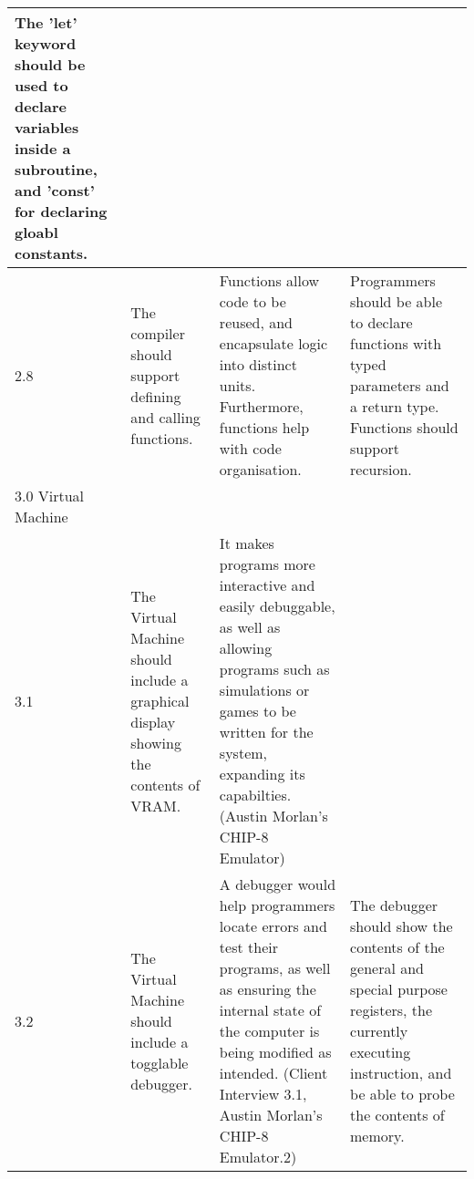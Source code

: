 \begin{longtable}{ | p{2cm} | p{4cm} | p{5cm} | p{4cm} | }
        The 'let' keyword should be used to declare variables inside a subroutine, and 'const' for declaring gloabl constants. 
        \\
    \hline
        2.8 & 
        The compiler should support defining and calling functions. &
        Functions allow code to be reused, and encapsulate logic into distinct units. Furthermore, functions help with code organisation. &
        Programmers should be able to declare functions with typed parameters and a return type. Functions should support recursion.
        \\
    \hline
        3.0 Virtual Machine & 
        &
        & 
       \\
    \hline
        3.1 & 
        The Virtual Machine should include a graphical display showing the contents of VRAM. &
        It makes programs more interactive and easily debuggable, as well as allowing programs such as simulations or games to be written for the system, expanding its capabilties. (Austin Morlan's CHIP-8 Emulator) & 
        \\
    \hline
        3.2 & 
        The Virtual Machine should include a togglable debugger. &
        A debugger would help programmers locate errors and test their programs, as well as ensuring the internal state of the computer is being modified as intended. (Client Interview 3.1, Austin Morlan's CHIP-8 Emulator.2) & 
        The debugger should show the contents of the general and special purpose registers, the currently executing instruction, and be able to probe the contents of memory. \\
    \hline
\end{longtable}